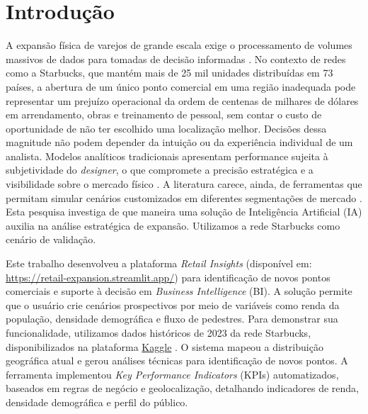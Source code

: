 \section{\esp Introdução}

A expansão física de varejos de grande escala exige o processamento de volumes massivos de dados para tomadas de decisão informadas \cite{mallela2024}. No contexto de redes como a Starbucks, que mantém mais de 25 mil unidades distribuídas em 73 países, a abertura de um único ponto comercial em uma região inadequada pode representar um prejuízo operacional da ordem de centenas de milhares de dólares em arrendamento, obras e treinamento de pessoal, sem contar o custo de oportunidade de não ter escolhido uma localização melhor. Decisões dessa magnitude não podem depender da intuição ou da experiência individual de um analista. Modelos analíticos tradicionais apresentam performance sujeita à subjetividade do \textit{designer}, o que compromete a precisão estratégica e a visibilidade sobre o mercado físico \cite{mallela2024, okorie2024}. A literatura carece, ainda, de ferramentas que permitam simular cenários customizados em diferentes segmentações de mercado \cite{rajan2024}. Esta pesquisa investiga de que maneira uma solução de Inteligência Artificial (IA) auxilia na análise estratégica de expansão. Utilizamos a rede Starbucks como cenário de validação.

Este trabalho desenvolveu a plataforma \textit{Retail Insights} (disponível em: \url{https://retail-expansion.streamlit.app/}) para identificação de novos pontos comerciais e suporte à decisão em \textit{Business Intelligence} (BI). A solução permite que o usuário crie cenários prospectivos por meio de variáveis como renda da população, densidade demográfica e fluxo de pedestres. Para demonstrar sua funcionalidade, utilizamos dados históricos de 2023 da rede Starbucks, disponibilizados na plataforma \href{https://www.kaggle.com/datasets/omarsobhy14/starbucks-store-location-2023}{Kaggle} \cite{omarsobhy2023}. O sistema mapeou a distribuição geográfica atual e gerou análises técnicas para identificação de novos pontos. A ferramenta implementou \textit{Key Performance Indicators} (KPIs) automatizados, baseados em regras de negócio e geolocalização, detalhando indicadores de renda, densidade demográfica e perfil do público.

